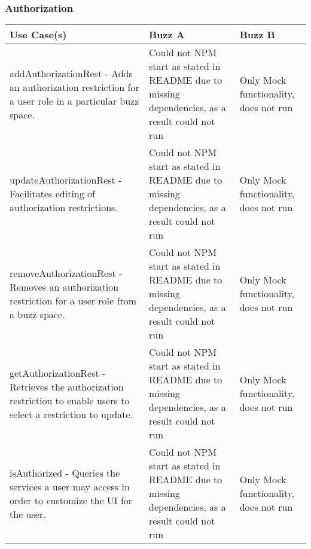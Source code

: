 \documentclass[12pt]{article}
\begin{document}
\subsubsection{Authorization}%
\begin{tabular}{|p{4.5cm}|p{4.5cm}|p{4.5cm}|}

\hline
Use Case(s) & Buzz A & Buzz B \\ 
\hline
addAuthorizationRest - Adds an authorization restriction for a user role in a particular buzz space. & Could not NPM start as stated in README due to missing dependencies, as a result could not run & Only Mock functionality, does not run\\ %
\hline
updateAuthorizationRest - Facilitates editing of authorization restrictions. &  Could not NPM start as stated in README due to missing dependencies, as a result could not run & Only Mock functionality, does not run\\ %
\hline
removeAuthorizationRest - Removes an authorization restriction for a user role from a buzz space. &  Could not NPM start as stated in README due to missing dependencies, as a result could not run & Only Mock functionality, does not run\\ %
\hline
getAuthorizationRest - Retrieves the authorization restriction to enable users to select a restriction to update. & Could not NPM start as stated in README due to missing dependencies, as a result could not run & Only Mock functionality, does not run\\ %
\hline
isAuthorized - Queries the services a user may access in order to customize the UI for the user. & Could not NPM start as stated in README due to missing dependencies, as a result could not run& Only Mock functionality, does not run\\ %
\hline

\end{tabular}
\end{document}
